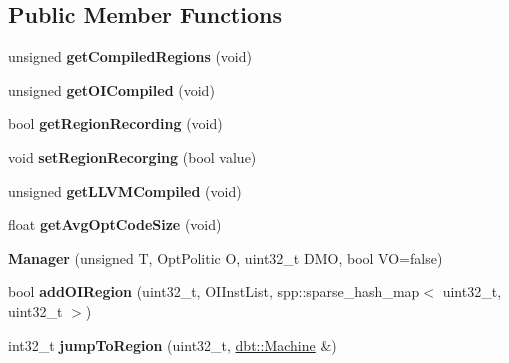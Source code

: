 \subsection*{Public Member Functions}
\begin{DoxyCompactItemize}
\item 
unsigned {\bfseries get\+Compiled\+Regions} (void)\hypertarget{classdbt_1_1_manager_a02b0c49e1ef8198f9a79c5f67800001c}{}\label{classdbt_1_1_manager_a02b0c49e1ef8198f9a79c5f67800001c}

\item 
unsigned {\bfseries get\+O\+I\+Compiled} (void)\hypertarget{classdbt_1_1_manager_a030b27ab968b08de952fae2e7d22d174}{}\label{classdbt_1_1_manager_a030b27ab968b08de952fae2e7d22d174}

\item 
bool {\bfseries get\+Region\+Recording} (void)\hypertarget{classdbt_1_1_manager_a3ab02f4c343d355196699bf40384a341}{}\label{classdbt_1_1_manager_a3ab02f4c343d355196699bf40384a341}

\item 
void {\bfseries set\+Region\+Recorging} (bool value)\hypertarget{classdbt_1_1_manager_a119e33aa5f55216cfb1b499267d896f5}{}\label{classdbt_1_1_manager_a119e33aa5f55216cfb1b499267d896f5}

\item 
unsigned {\bfseries get\+L\+L\+V\+M\+Compiled} (void)\hypertarget{classdbt_1_1_manager_a3cf205ecdf7e4c5fc8f093f19a5d6df0}{}\label{classdbt_1_1_manager_a3cf205ecdf7e4c5fc8f093f19a5d6df0}

\item 
float {\bfseries get\+Avg\+Opt\+Code\+Size} (void)\hypertarget{classdbt_1_1_manager_aaa9d11a4aad3d516990c43bed79bf89b}{}\label{classdbt_1_1_manager_aaa9d11a4aad3d516990c43bed79bf89b}

\item 
{\bfseries Manager} (unsigned T, Opt\+Politic O, uint32\+\_\+t D\+MO, bool VO=false)\hypertarget{classdbt_1_1_manager_a8da7c7aedea57f0eb0423a13ca88857e}{}\label{classdbt_1_1_manager_a8da7c7aedea57f0eb0423a13ca88857e}

\item 
bool {\bfseries add\+O\+I\+Region} (uint32\+\_\+t, O\+I\+Inst\+List, spp\+::sparse\+\_\+hash\+\_\+map$<$ uint32\+\_\+t, uint32\+\_\+t $>$)\hypertarget{classdbt_1_1_manager_a1df1e85b4961d798c3a6349bedca6476}{}\label{classdbt_1_1_manager_a1df1e85b4961d798c3a6349bedca6476}

\item 
int32\+\_\+t {\bfseries jump\+To\+Region} (uint32\+\_\+t, \hyperlink{classdbt_1_1_machine}{dbt\+::\+Machine} \&)\hypertarget{classdbt_1_1_manager_af2e8e3d36f2e2d26389d1e174f0ae22e}{}\label{classdbt_1_1_manager_af2e8e3d36f2e2d26389d1e174f0ae22e}


\end{DoxyCompactItemize}
